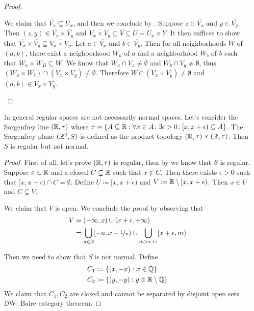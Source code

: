 \documentclass{techreport}
\newcommand{\diw}[1]{{\color{Red} DW: #1}}
\begin{document}
\begin{proof}
\begin{itemize}
		We claim that $\overline{V_x} \subseteq U_x$, and then we conclude by .
		Suppose $z \in \overline{V_x}$ and $y \in \overline{V_y}$.
		Then $(z,y) \in \overline{V_x} \times \overline{V_y}$ and $\overline{V_x \times V_y} \subseteq \overline{V} \subseteq U = U_x \times Y$.
		It then suffices to show that $\overline{V_x} \times \overline{V_y} \subseteq \overline{V_x \times V_y}$.
		Let $a \in \overline{V_x}$ and $b \in \overline{V_y}$.
		Then for all neighborhoods $W$ of $(a,b)$, there exist a neighborhood $W_a$ of $a$ and a neighborhood $W_b$ of $b$ such that $W_a \times W_B \subseteq W$.
		We know that $W_a \cap V_x \neq \emptyset$ and $W_b \cap V_y \neq \emptyset$,
		thus $(W_a \times W_b) \cap (V_x \times V_y) \neq \emptyset$.
		Therefore $W \cap (V_x \times V_y) \neq \emptyset$ and $(a,b) \in \overline{V_x\times V_y}$.
	\end{itemize}
\end{proof}

\begin{example}\label{Exa:RegularNotImplyNormal}
	In general regular spaces are not necessarily normal spaces.
	Let's consider the Sorgenfrey line $(\mathbb{R},\tau)$ where $\tau = \{ A \subseteq \mathbb{R} : \forall {x \in A}\!: \exists {\epsilon > 0}\!: [x,x+\epsilon) \subseteq A \}$.
	The Sorgenfrey plane $(\mathbb{R}^2,S)$ is defined as the product topology $(\mathbb{R},\tau) \times (\mathbb{R},\tau)$.
	Then $S$ is regular but not normal.
\end{example}
\begin{proof}
	First of all, let's prove $(\mathbb{R},\tau)$ is regular, then by  we know that $S$ is regular.
	Suppose $x \in \mathbb{R}$ and a closed $C \subseteq \mathbb{R}$ such that $x \not\in C$.
	Then there exists $\epsilon>0$ such that $[x,x+\epsilon) \cap C = \emptyset$.
	Define $U \coloneqq [x,x+\epsilon)$ and $V \coloneqq \mathbb{R} \setminus [x,x+\epsilon)$.
	Then $x \in U$ and $C \subseteq V$.
	
	We claim that $V$ is open. We conclude the proof by observing that
	\begin{align}
		V & = (-\infty,x) \cup [x+\epsilon,+\infty) \\
		& = \bigcup_{n \in \mathbb{N}} [-n, x-\nicefrac{1}{n}) \cup \bigcup_{m > x + \epsilon} [x+\epsilon,m)
	\end{align}
	
	Then we need to show that $S$ is not normal.
	Define
	\begin{align}
		C_1 & \coloneqq \{ (x,-x) : x \in \mathbb{Q} \} \\
		C_2 & \coloneqq \{ (y,-y) : y \in \mathbb{R} \setminus \mathbb{Q} \}
	\end{align}
	We claim that $C_1,C_2$ are closed and cannot be separated by disjoint open sets.
	\diw{Baire category theorem.}
\end{proof}
\end{document}
